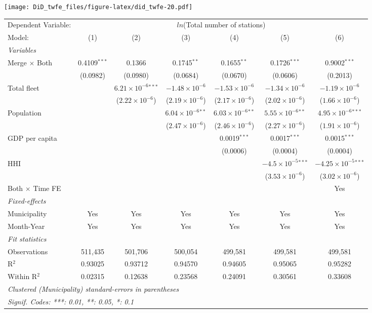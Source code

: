 \documentclass[
]{article}
\begin{document}
\texttt{[image: DiD\_twfe\_files/figure-latex/did\_twfe-20.pdf]}

\begin{tabular}{lcccccc}
\tabularnewline\midrule\midrule
Dependent Variable:&\multicolumn{6}{c}{$ln$(Total number of stations)}\\
Model:&(1) & (2) & (3) & (4) & (5) & (6)\\
\midrule \emph{Variables}&   &   &   &   &   &  \\
Merge $\times $ Both & 0.4109$^{***}$ & 0.1366 & 0.1745$^{**}$ & 0.1655$^{**}$ & 0.1726$^{***}$ & 0.9002$^{***}$\\
  &(0.0982) & (0.0980) & (0.0684) & (0.0670) & (0.0606) & (0.2013)\\
Total fleet &    & $6.21\times 10^{-6}$$^{***}$ & $-1.48\times 10^{-6}$ & $-1.53\times 10^{-6}$ & $-1.34\times 10^{-6}$ & $-1.19\times 10^{-6}$\\
  &   & ($2.22\times 10^{-6}$) & ($2.19\times 10^{-6}$) & ($2.17\times 10^{-6}$) & ($2.02\times 10^{-6}$) & ($1.66\times 10^{-6}$)\\
Population &    &    & $6.04\times 10^{-6}$$^{**}$ & $6.03\times 10^{-6}$$^{**}$ & $5.55\times 10^{-6}$$^{**}$ & $4.95\times 10^{-6}$$^{***}$\\
  &   &    & ($2.47\times 10^{-6}$) & ($2.46\times 10^{-6}$) & ($2.27\times 10^{-6}$) & ($1.91\times 10^{-6}$)\\
GDP per capita &    &    &    & 0.0019$^{***}$ & 0.0017$^{***}$ & 0.0015$^{***}$\\
  &   &    &    & (0.0006) & (0.0004) & (0.0004)\\
HHI &    &    &    &    & $-4.5\times 10^{-5}$$^{***}$ & $-4.25\times 10^{-5}$$^{***}$\\
  &   &    &    &    & ($3.53\times 10^{-6}$) & ($3.02\times 10^{-6}$)\\
Both $\times$ Time FE &  &  &  &  &  & Yes\\
\midrule \emph{Fixed-effects}&   &   &   &   &   &  \\
Municipality & Yes & Yes & Yes & Yes & Yes & Yes\\
Month-Year & Yes & Yes & Yes & Yes & Yes & Yes\\
\midrule \emph{Fit statistics}&  & & & & & \\
Observations & 511,435&501,706&500,054&499,581&499,581&499,581\\
R$^2$ & 0.93025&0.93712&0.94570&0.94605&0.95065&0.95282\\
Within R$^2$ & 0.02315&0.12638&0.23568&0.24091&0.30561&0.33608\\
\midrule\midrule\multicolumn{7}{l}{\emph{Clustered (Municipality) standard-errors in parentheses}}\\
\multicolumn{7}{l}{\emph{Signif. Codes: ***: 0.01, **: 0.05, *: 0.1}}\\
\end{tabular}
\end{document}
